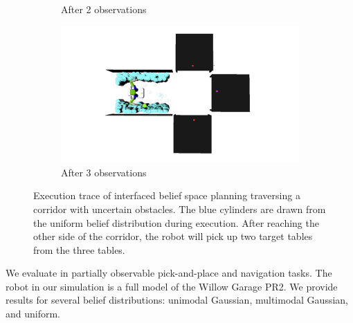 \begin{figure}
\begin{subfigure}[b]{0.22\linewidth}
    \caption{After 2 observations}
  \end{subfigure}
  \begin{subfigure}[b]{0.22\linewidth}
    \includegraphics[width=\textwidth]{corridor_images/3-observe.png}
    \caption{After 3 observations}
  \end{subfigure}
  \caption{Execution trace of interfaced belief space planning
    traversing a corridor with uncertain obstacles.
    The blue cylinders are drawn from the uniform belief distribution
    during execution. After reaching the other side of the corridor,
    the robot will pick up two target tables from the three tables.}
  \label{fig:corridorimgs}
\end{figure}

We evaluate \ibsp{} in partially observable pick-and-place and navigation tasks.
The robot in our simulation is a full model of the Willow Garage PR2. We
provide results for several belief distributions: unimodal Gaussian, multimodal
Gaussian, and uniform.
